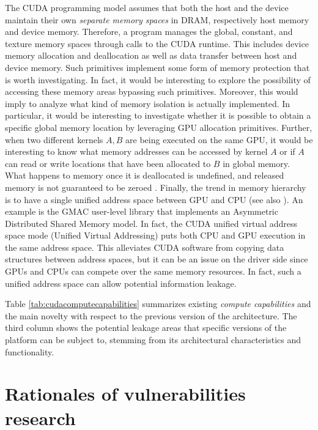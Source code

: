 \documentclass[11pt,onecolumn,letterpaper]{IEEEtran}
\begin{document}
The CUDA programming model assumes that both the host and the device maintain their own \emph{separate memory spaces} in DRAM,
respectively host memory and device memory.
Therefore, a program manages the global, constant, and texture memory spaces through calls to the CUDA runtime.
This includes device memory allocation and deallocation as well as data transfer between host and device memory.
Such primitives implement some form of memory protection that is worth investigating.
In fact, it would be interesting to explore the possibility of accessing these memory areas bypassing such primitives.
Moreover, this would imply to analyze what kind of memory isolation is actually implemented.
In particular, it would be interesting to investigate whether it is possible to obtain a specific global memory location by leveraging GPU allocation primitives.
Further, when two different kernels $A,B$ are being executed on the same GPU,
it would be interesting to know what memory addresses can be accessed by kernel $A$
or if $A$ can read or write locations that have been allocated to $B$ in global memory.
What happens to memory once it is deallocated is undefined, and released memory is not guaranteed to be zeroed \cite{zeroizzazione, zeroizzazione2}.
Finally, the trend in memory hierarchy is to have a single unified address space between GPU and CPU (see also \cite{cudadevguide}).
An example is the GMAC \cite{gmac} user-level library that implements an Asymmetric Distributed Shared Memory model.
In fact, the CUDA unified virtual address space mode (Unified Virtual Addressing) puts both CPU and GPU execution in the same address space.
This alleviates CUDA software from copying data structures between address spaces, 
but it can be an issue on the driver side since GPUs and CPUs can compete over the same memory resources.
In fact, such a unified address space can allow potential information leakage. 

Table \ref{tab:cudacomputecapabilities} summarizes existing \textit{compute capabilities}
and the main novelty with respect to the previous version of the architecture.
The third column shows the potential leakage areas that specific versions of the platform can be subject to,
stemming from its architectural characteristics and functionality.

\section{Rationales of vulnerabilities research}
\label{ourapproach}
\end{document}
